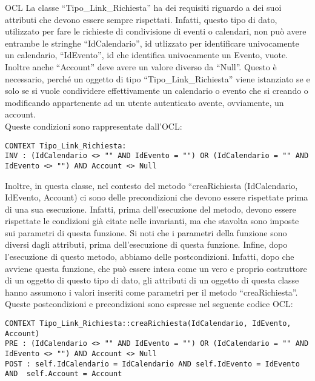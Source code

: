 \begin{listaPersonale}{OCL}
    La classe “Tipo\_Link\_Richiesta” ha dei requisiti riguardo a dei suoi attributi che devono essere sempre rispettati. Infatti, questo tipo di dato, utilizzato per fare le richieste di condivisione di eventi o calendari, non può avere entrambe le stringhe “IdCalendario”, id utlizzato per identificare univocamente un calendario, “IdEvento”, id che identifica univocamente un Evento, vuote. Inoltre anche “Account” deve avere un valore diverso da “Null”. Questo è necessario, perché un oggetto di tipo “Tipo\_Link\_Richiesta” viene istanziato se e solo se si vuole condividere effettivamente un calendario o evento che si creando o modificando appartenente ad un utente autenticato avente, ovviamente, un account.\\
    Queste condizioni sono rappresentate dall’OCL:

    \begin{lstlisting}
CONTEXT Tipo_Link_Richiesta:
INV : (IdCalendario <> "" AND IdEvento = "") OR (IdCalendario = "" AND IdEvento <> "") AND Account <> Null
    \end{lstlisting}
    Inoltre, in questa classe, nel contesto del metodo “creaRichiesta (IdCalendario, IdEvento, Account) ci sono delle precondizioni che devono essere rispettate prima di una sua esecuzione. Infatti, prima dell’esecuzione del metodo, devono essere rispettate le condizioni già citate nelle invarianti, ma che stavolta sono imposte sui parametri di questa funzione. Si noti che i parametri della funzione sono diversi dagli attributi, prima dell’esecuzione di questa funzione.
    Infine, dopo l’esecuzione di questo metodo, abbiamo delle postcondizioni. Infatti, dopo che avviene questa funzione, che può essere intesa come un vero e proprio costruttore di un oggetto di questo tipo di dato, gli attributi di un oggetto di questa classe hanno assumono i valori inseriti come parametri per il metodo “creaRichiesta”. \\
    Queste postcondizioni e precondizioni sono espresse nel seguente codice OCL:

    \begin{lstlisting}
CONTEXT Tipo_Link_Richiesta::creaRichiesta(IdCalendario, IdEvento, Account)
PRE : (IdCalendario <> "" AND IdEvento = "") OR (IdCalendario = "" AND IdEvento <> "") AND Account <> Null
POST : self.IdCalendario = IdCalendario AND self.IdEvento = IdEvento AND  self.Account = Account  
    \end{lstlisting}





\end{listaPersonale}
